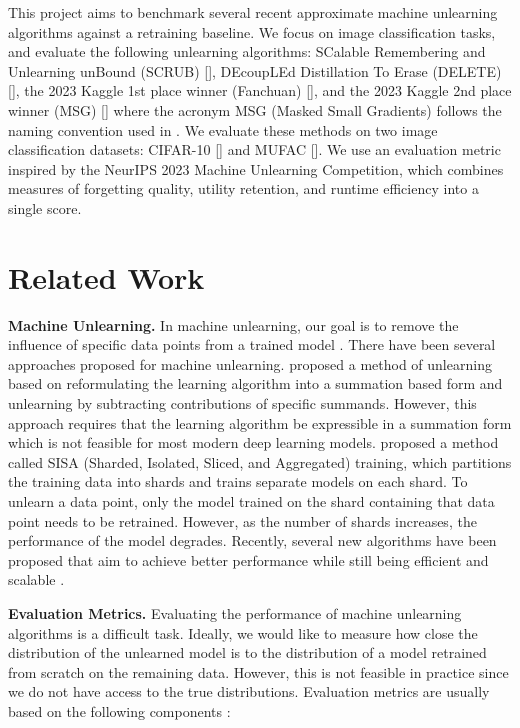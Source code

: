 \documentclass{article}
\begin{document}
This project aims to benchmark several recent approximate machine unlearning algorithms against a retraining baseline. We focus on image classification tasks, and evaluate the following unlearning algorithms: 
SCalable Remembering and Unlearning unBound (SCRUB) [\cite{kurmanji2023unboundedmachineunlearning}], DEcoupLEd Distillation To Erase (DELETE) [\cite{zhou2025decoupleddistillationerasegeneral}], the 2023 Kaggle 1st place winner (Fanchuan) [\cite{2023-winner}], and the 2023 Kaggle 2nd place winner (MSG) [\cite{2023-second-place}] where the acronym MSG (Masked Small Gradients) follows the naming convention used in \citet{cadet2025}. 
We evaluate these methods on two image classification datasets: CIFAR-10 [\cite{Krizhevsky09learningmultiple}] and MUFAC [\cite{choi2023machine}]. We use an evaluation metric inspired by the NeurIPS 2023 Machine Unlearning Competition, which combines measures of forgetting quality, utility retention, and runtime efficiency into a single score.

\section{Related Work}
\textbf{Machine Unlearning.} In machine unlearning, our goal is to remove the influence of specific data points from a trained model \citep{bourtoule2021machine, zhang2023review}. There have been several approaches proposed for machine unlearning. \citet{cao2015towards} proposed a method of unlearning based on reformulating the learning algorithm into a summation based form and unlearning by subtracting contributions of specific summands. However, this approach requires that the learning algorithm be expressible in a summation form which is not feasible for most modern deep learning models. 
\cite{bourtoule2021machine} proposed a method called SISA (Sharded, Isolated, Sliced, and Aggregated) training, which partitions the training data into shards and trains separate models on each shard. To unlearn a data point, only the model trained on the shard containing that data point needs to be retrained. However, as the number of shards increases, the performance of the model degrades. Recently, several new algorithms have been proposed that aim to achieve better performance while still being efficient and scalable \citep{cadet2025, kurmanji2023unboundedmachineunlearning, zhou2025decoupleddistillationerasegeneral}.

\textbf{Evaluation Metrics.} Evaluating the performance of machine unlearning algorithms is a difficult task. Ideally, we would like to measure how close the distribution of the unlearned model is to the distribution of a model retrained from scratch on the remaining data. However, this is not feasible in practice since we do not have access to the true distributions. Evaluation metrics are usually based on the following components \citep{li2025overview}: 
\end{document}
